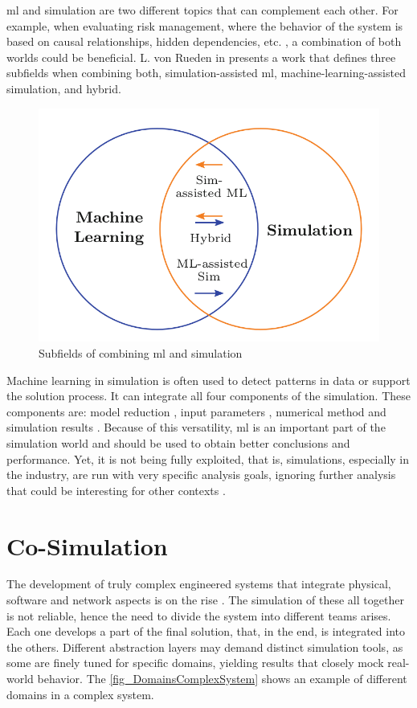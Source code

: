\gls{ml} and simulation are two different topics that can complement each other. For example, when evaluating risk management, where the 
behavior of the system is based on causal relationships, hidden dependencies, etc. \cite{mitchell2017natural}, a combination of both worlds 
could be beneficial.  L. von Rueden in \cite{von2020combining} presents a work that defines three subfields when combining both, 
simulation-assisted \gls{ml}, machine-learning-assisted simulation, and hybrid.

\begin{figure}[H]
	\centering
 	\includegraphics[width=0.5\linewidth]{Images/SimAndML.png}
 	\caption{Subfields of combining \gls{ml} and simulation \cite{von2020combining}}
\end{figure}

Machine learning in simulation is often used to detect patterns in data or support the solution process. It can integrate all four components 
of the simulation. These components are: model reduction \cite{benner2015survey}, input parameters \cite{tsymbalov2019deeper}, numerical 
method \cite{noe2020machine} and simulation results \cite{albertsson2018machine}. Because of this versatility, \gls{ml} is an important part 
of the simulation world and should be used to obtain better conclusions and performance. Yet, it is not being fully exploited, that is, 
simulations, especially in the industry, are run with very specific analysis goals, ignoring further analysis that could be interesting for 
other contexts \cite{von2020combining}.

\section{Co-Simulation}

The development of truly complex engineered systems that integrate physical, software and network aspects is on the rise \cite{gomes2017co}. 
The simulation of these all together is not reliable, hence the need to divide the system into different teams arises. Each one develops a 
part of the final solution, that, in the end, is integrated into the others. Different abstraction layers may demand distinct simulation tools, 
as some are finely tuned for specific domains, yielding results that closely mock real-world behavior. The \autoref{fig_DomainsComplexSystem} 
shows an example of different domains in a complex system. 

